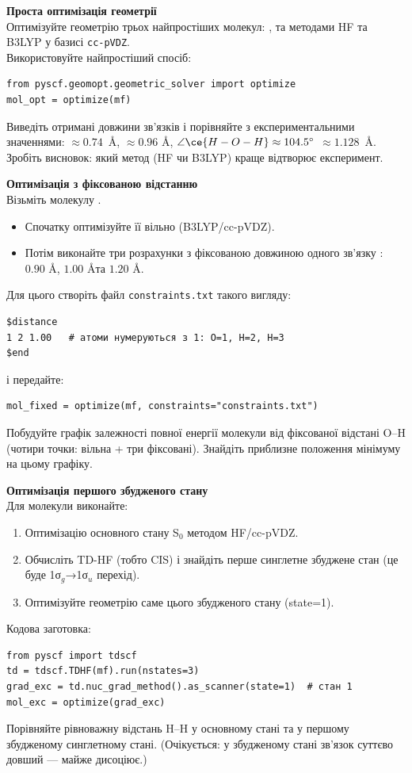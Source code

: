\begin{tasks}

\item \textbf{Проста оптимізація геометрії}\\
Оптимізуйте геометрію трьох найпростіших молекул: ,  та  методами HF та B3LYP у базисі \texttt{cc-pVDZ}.\\
Використовуйте найпростіший спосіб:
\begin{verbatim}
from pyscf.geomopt.geometric_solver import optimize
mol_opt = optimize(mf)
\end{verbatim}
Виведіть отримані довжини зв’язків і порівняйте з експериментальними значеннями:
 $\approx 0.74$~\AA,  $\approx 0.96$ \AA,  $\angle \ce{H-O-H}\approx 104.5^\circ$  $\approx 1.128$~\AA.
Зробіть висновок: який метод (HF чи B3LYP) краще відтворює експеримент.

\item \textbf{Оптимізація з фіксованою відстанню}\\
Візьміть молекулу .
\begin{itemize}
\item Спочатку оптимізуйте її вільно (B3LYP/cc-pVDZ).
\item Потім виконайте три розрахунки з фіксованою довжиною одного зв’язку :   $0.90$ \AA, $1.00$ \AA та $1.20$ \AA.
\end{itemize}
Для цього створіть файл \texttt{constraints.txt} такого вигляду:
\begin{verbatim}
$distance
1 2 1.00   # атоми нумеруються з 1: O=1, H=2, H=3
$end
\end{verbatim}
і передайте:
\begin{verbatim}
mol_fixed = optimize(mf, constraints="constraints.txt")
\end{verbatim}
Побудуйте графік залежності повної енергії молекули від фіксованої відстані O–H (чотири точки: вільна + три фіксовані). Знайдіть приблизне положення мінімуму на цьому графіку.

\item \textbf{Оптимізація першого збудженого стану }\\
Для молекули  виконайте:
\begin{enumerate}[label={\alph*)}]
\item Оптимізацію основного стану S$_0$ методом HF/cc-pVDZ.
\item Обчисліть TD-HF (тобто CIS) і знайдіть перше синглетне збуджене стан (це буде 1σ$_g$→1σ$_u$ перехід).
\item Оптимізуйте геометрію саме цього збудженого стану (state=1).
\end{enumerate}
Кодова заготовка:
\begin{verbatim}
from pyscf import tdscf
td = tdscf.TDHF(mf).run(nstates=3)
grad_exc = td.nuc_grad_method().as_scanner(state=1)  # стан 1
mol_exc = optimize(grad_exc)
\end{verbatim}
Порівняйте рівноважну відстань H–H у основному стані та у першому збудженому синглетному стані.
(Очікується: у збудженому стані зв’язок суттєво довший — майже дисоціює.)

\end{tasks}